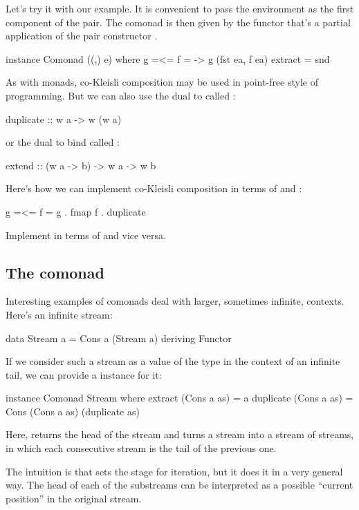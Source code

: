 \documentclass[DaoFP]{subfiles}
\begin{document}
Let's try it with our example. It is convenient to pass the environment as the first component of the pair. The comonad is then given by the functor that's a partial application of the pair constructor .
\begin{haskell}
instance Comonad ((,) e) where
  g =<= f = \ea -> g (fst ea, f ea)
  extract = snd
\end{haskell}

As with monads, co-Kleisli composition may be used in point-free style of programming. But we can also use the dual to  called :
\begin{haskell}
  duplicate :: w a -> w (w a)
\end{haskell}
or the dual to bind called :
\begin{haskell}
  extend :: (w a -> b) -> w a -> w b
\end{haskell}
Here's how we can implement co-Kleisli composition in terms of  and :
\begin{haskell}
   g =<= f = g . fmap f . duplicate
\end{haskell}
\begin{exercise}
Implement  in terms of  and vice versa.
\end{exercise}
\subsection{The  comonad}
Interesting examples of comonads deal with larger, sometimes infinite, contexts. Here's an infinite stream:
\begin{haskell}
data Stream a = Cons a (Stream a)
    deriving Functor
\end{haskell}

If we consider such a stream as a value of the type  in the context of an infinite tail, we can provide a  instance for it:
\begin{haskell}
instance Comonad Stream where
  extract (Cons a as) = a
  duplicate (Cons a as) = Cons (Cons a as) (duplicate as)
\end{haskell}
Here,  returns the head of the stream and  turns a stream into a stream of streams, in which each consecutive stream is the tail of the previous one. 

The intuition is that  sets the stage for iteration, but it does it in a very general way. The head of each of the substreams can be interpreted as a possible ``current position'' in the original stream. 
\end{document}
